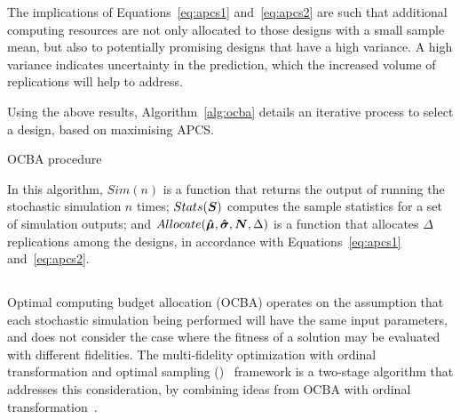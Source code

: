 The implications of Equations~\ref{eq:apcs1} and~\ref{eq:apcs2} are such that additional computing resources are not only allocated to those designs with a small sample mean, but also to potentially promising designs that have a high variance. A high variance indicates uncertainty in the prediction, which the increased volume of replications will help to address.

Using the above results, Algorithm~\ref{alg:ocba} details an iterative process to select a design, based on maximising APCS.

\begin{algorithm}[h!] 
\caption{OCBA procedure}
\label{alg:ocba}
{\footnotesize
\begin{algorithmic}[1]
 
 
 
\label{while-loop}
   
   
   
   
   
\ENDWHILE
\end{algorithmic}
}
\end{algorithm}

In this algorithm, $Sim(n)$ is a function that returns the output of running the stochastic simulation $n$ times; $Stats(\boldsymbol{S})$ computes the sample statistics for a set of simulation outputs; and $Allocate(\boldsymbol{\hat{\mu}},\boldsymbol{\hat{\sigma}},\boldsymbol{N},\Delta)$ is a function that allocates $\Delta$ replications among the designs, in accordance with Equations~\ref{eq:apcs1} and~\ref{eq:apcs2}.

\subsection{\motos{}}
Optimal computing budget allocation (OCBA) operates on the assumption that each stochastic simulation being performed will have the same input parameters, and does not consider the case where the fitness of a solution may be evaluated with different fidelities. The multi-fidelity optimization with ordinal transformation and optimal sampling (\motos{})~\cite{xu2016mo2tos} framework is a two-stage algorithm that addresses this consideration, by combining ideas from OCBA with ordinal transformation~\cite{xu2014ordinal}.

